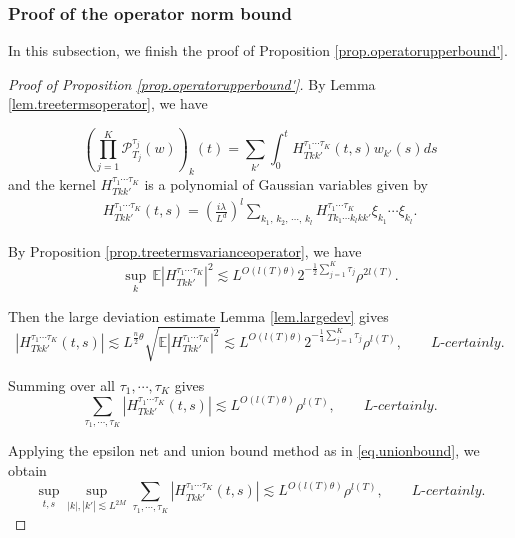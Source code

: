 \subsubsection{Proof of the operator norm bound} In this subsection, we finish the proof of Proposition \ref{prop.operatorupperbound'}.

\begin{proof}[Proof of Proposition \ref{prop.operatorupperbound'}]
By Lemma \ref{lem.treetermsoperator}, we have 

\begin{equation}
    \left(\prod_{j=1}^K\mathcal{P}^{\tau_j}_{T_j}(w)\right)_{k}(t)=\sum_{k'}\int_0^t H^{\tau_1\cdots \tau_{K}}_{Tkk'}(t,s) w_{k'}(s) ds
\end{equation}
and the kernel $H^{\tau_1\cdots \tau_{K}}_{Tkk'}$ is a polynomial of Gaussian variables given by
\begin{equation}
\begin{split}
H^{\tau_1\cdots \tau_{K}}_{Tkk'}(t,s)=\left(\frac{i\lambda}{L^{d}}\right)^l\sum_{k_1,\, k_2,\, \cdots,\, k_{l}} H^{\tau_1\cdots \tau_{K}}_{Tk_1\cdots k_{l}kk'} \xi_{k_1}\cdots \xi_{k_{l}}.
\end{split}
\end{equation}

By Proposition \ref{prop.treetermsvarianceoperator}, we have
\begin{equation}
    \sup_k\, \mathbb{E}|H^{\tau_1\cdots \tau_{K}}_{Tkk'}|^2\lesssim L^{O(l(T)\theta)}2^{-\frac{1}{2}\sum_{j=1}^K \tau_{j}} \rho^{2l(T)}.
\end{equation}

Then the large deviation estimate Lemma \ref{lem.largedev} gives 
\begin{equation}
|H^{\tau_1\cdots \tau_{K}}_{Tkk'}(t,s)|\lesssim L^{\frac{n}{2}\theta} \sqrt{\mathbb{E}|H^{\tau_1\cdots \tau_{K}}_{Tkk'}|^2}\lesssim L^{O(l(T)\theta)} 2^{-\frac{1}{4}\sum_{j=1}^K \tau_{j}} \rho^{l(T)},\qquad \textit{L-certainly}.
\end{equation} 

Summing over all $\tau_1,\cdots, \tau_{K}$ gives
\begin{equation}
\sum_{\tau_1,\cdots, \tau_{K}}|H^{\tau_1\cdots \tau_{K}}_{Tkk'}(t,s)|\lesssim L^{O(l(T)\theta)} \rho^{l(T)},\qquad \textit{L-certainly}.
\end{equation} 

Applying the epsilon net and union bound method as in \eqref{eq.unionbound}, we obtain
\begin{equation}
    \sup_{t,s}\sup_{|k|,|k'|\lesssim L^{2M}}\sum_{\tau_1,\cdots, \tau_{K}}|H^{\tau_1\cdots \tau_{K}}_{Tkk'}(t,s)|\lesssim L^{O(l(T)\theta)}  \rho^{l(T)},\qquad \textit{L-certainly}.
\end{equation}


\end{proof}
